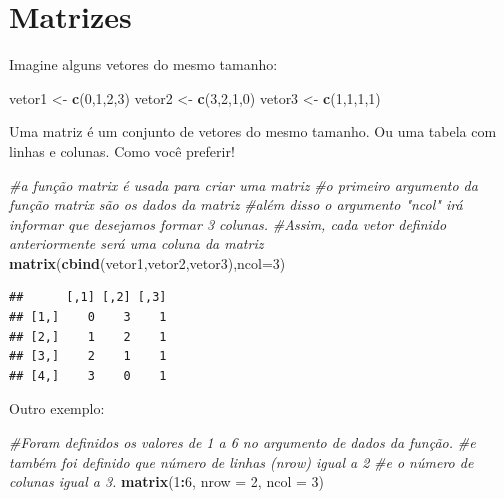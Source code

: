 \documentclass[
]{book}
\newenvironment{Shaded}{\begin{snugshade}}{\end{snugshade}}
\newcommand{\CommentTok}[1]{\textcolor[rgb]{0.56,0.35,0.01}{\textit{#1}}}
\newcommand{\DataTypeTok}[1]{\textcolor[rgb]{0.13,0.29,0.53}{#1}}
\newcommand{\DecValTok}[1]{\textcolor[rgb]{0.00,0.00,0.81}{#1}}
\newcommand{\KeywordTok}[1]{\textcolor[rgb]{0.13,0.29,0.53}{\textbf{#1}}}
\newcommand{\NormalTok}[1]{#1}
\newcommand{\OperatorTok}[1]{\textcolor[rgb]{0.81,0.36,0.00}{\textbf{#1}}}
\newcommand{\StringTok}[1]{\textcolor[rgb]{0.31,0.60,0.02}{#1}}
\begin{document}
\hypertarget{matrizes}{%
\section{Matrizes}\label{matrizes}}

Imagine alguns vetores do mesmo tamanho:

\begin{Shaded}
\begin{Highlighting}[]
\NormalTok{vetor1 <-}\StringTok{ }\KeywordTok{c}\NormalTok{(}\DecValTok{0}\NormalTok{,}\DecValTok{1}\NormalTok{,}\DecValTok{2}\NormalTok{,}\DecValTok{3}\NormalTok{)}
\NormalTok{vetor2 <-}\StringTok{ }\KeywordTok{c}\NormalTok{(}\DecValTok{3}\NormalTok{,}\DecValTok{2}\NormalTok{,}\DecValTok{1}\NormalTok{,}\DecValTok{0}\NormalTok{)}
\NormalTok{vetor3 <-}\StringTok{ }\KeywordTok{c}\NormalTok{(}\DecValTok{1}\NormalTok{,}\DecValTok{1}\NormalTok{,}\DecValTok{1}\NormalTok{,}\DecValTok{1}\NormalTok{)}
\end{Highlighting}
\end{Shaded}

Uma matriz é um conjunto de vetores do mesmo tamanho. Ou uma tabela com
linhas e colunas. Como você preferir!

\begin{Shaded}
\begin{Highlighting}[]
\CommentTok{#a função matrix é usada para criar uma matriz}
\CommentTok{#o primeiro argumento da função matrix são os dados da matriz}
\CommentTok{#além disso o argumento "ncol" irá informar que desejamos formar 3 colunas.}
\CommentTok{#Assim, cada vetor definido anteriormente será uma coluna da matriz}
\KeywordTok{matrix}\NormalTok{(}\KeywordTok{cbind}\NormalTok{(vetor1,vetor2,vetor3),}\DataTypeTok{ncol=}\DecValTok{3}\NormalTok{)}
\end{Highlighting}
\end{Shaded}

\begin{verbatim}
##      [,1] [,2] [,3]
## [1,]    0    3    1
## [2,]    1    2    1
## [3,]    2    1    1
## [4,]    3    0    1
\end{verbatim}

Outro exemplo:

\begin{Shaded}
\begin{Highlighting}[]
\CommentTok{#Foram definidos os valores de 1 a 6 no argumento de dados da função.}
\CommentTok{#e também foi definido que número de linhas (nrow) igual a 2}
\CommentTok{#e o número de colunas igual a 3.}
\KeywordTok{matrix}\NormalTok{(}\DecValTok{1}\OperatorTok{:}\DecValTok{6}\NormalTok{, }\DataTypeTok{nrow =} \DecValTok{2}\NormalTok{, }\DataTypeTok{ncol =} \DecValTok{3}\NormalTok{)}
\end{Highlighting}
\end{Shaded}
\end{document}
